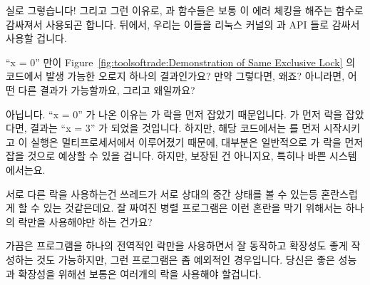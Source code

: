 \begin{enumerate}

\QuickA{}
	실로 그렇습니다!
	그리고 그런 이유로,  과
	 함수들은 보통 이 에러 체킹을 해주는 함수로
	감싸져서 사용되곤 합니다.
	뒤에서, 우리는 이들을 리눅스 커널의  과
	 API 들로 감싸서 사용할 겁니다.

\QuickQ{}
	``x = 0'' 만이 Figure~\ref{fig:toolsoftrade:Demonstration of Same
	Exclusive Lock} 의 코드에서 발생 가능한 오로지 하나의 결과인가요?
	만약 그렇다면, 왜죠?
	아니라면, 어떤 다른 결과가 가능할까요, 그리고 왜일까요?

\QuickA{}
	아닙니다.
	``x = 0'' 가 나온 이유는  가 락을 먼저 잡았기
	때문입니다.
	 가 먼저 락을 잡았다면, 결과는 ``x = 3'' 가 되었을
	것입니다.
	하지만, 해당 코드에서는  를 먼저 시작시키고 이 실행은
	멀티프로세서에서 이루어졌기 때문에, 대부분은 일반적으로
	 가 락을 먼저 잡을 것으로 예상할 수 있을 겁니다.
	하지만, 보장된 건 아니지요, 특히나 바쁜 시스템에서는요.

\QuickQ{}
	서로 다른 락을 사용하는건 쓰레드가 서로 상대의 중간 상태를 볼 수 있는등
	혼란스럽게 할 수 있는 것같은데요.
	잘 짜여진 병렬 프로그램은 이런 혼란을 막기 위해서는 하나의 락만을
	사용해야만 하는 건가요?

\QuickA{}
	가끔은 프로그램을 하나의 전역적인 락만을 사용하면서 잘 동작하고
	확장성도 좋게 작성하는 것도 가능하지만, 그런 프로그램은 좀 예외적인
	경우입니다.
	당신은 좋은 성능과 확장성을 위해선 보통은 여러개의 락을 사용해야
	할겁니다.


\end{enumerate}
